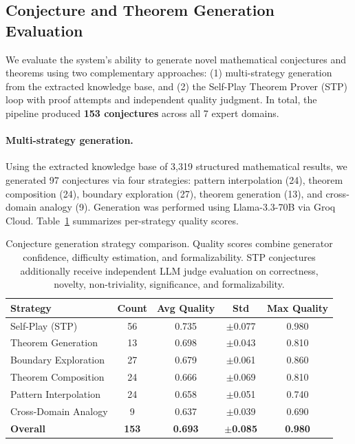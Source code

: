 \documentclass[11pt,a4paper]{article}
\begin{document}
\subsection{Conjecture and Theorem Generation Evaluation}
\label{sec:conjecture_eval}

We evaluate the system's ability to generate novel mathematical conjectures and theorems using two complementary approaches: (1) multi-strategy generation from the extracted knowledge base, and (2) the Self-Play Theorem Prover (STP) loop with proof attempts and independent quality judgment. In total, the pipeline produced \textbf{153 conjectures} across all 7 expert domains.

\paragraph{Multi-strategy generation.}
Using the extracted knowledge base of 3,319 structured mathematical results, we generated 97 conjectures via four strategies: pattern interpolation (24), theorem composition (24), boundary exploration (27), theorem generation (13), and cross-domain analogy (9). Generation was performed using Llama-3.3-70B via Groq Cloud. Table~\ref{tab:strategy_comparison} summarizes per-strategy quality scores.

\begin{table}[t]
\centering
\caption{Conjecture generation strategy comparison. Quality scores combine generator confidence, difficulty estimation, and formalizability. STP conjectures additionally receive independent LLM judge evaluation on correctness, novelty, non-triviality, significance, and formalizability.}
\label{tab:strategy_comparison}
\small
\begin{tabular}{@{}lcccc@{}}
\toprule
\textbf{Strategy} & \textbf{Count} & \textbf{Avg Quality} & \textbf{Std} & \textbf{Max Quality} \\
\midrule
Self-Play (STP) & 56 & 0.735 & $\pm$0.077 & 0.980 \\
Theorem Generation & 13 & 0.698 & $\pm$0.043 & 0.810 \\
Boundary Exploration & 27 & 0.679 & $\pm$0.061 & 0.860 \\
Theorem Composition & 24 & 0.666 & $\pm$0.069 & 0.810 \\
Pattern Interpolation & 24 & 0.658 & $\pm$0.051 & 0.740 \\
Cross-Domain Analogy & 9 & 0.637 & $\pm$0.039 & 0.690 \\
\midrule
\textbf{Overall} & \textbf{153} & \textbf{0.693} & $\pm$\textbf{0.085} & \textbf{0.980} \\
\bottomrule
\end{tabular}
\end{table}
\end{document}
